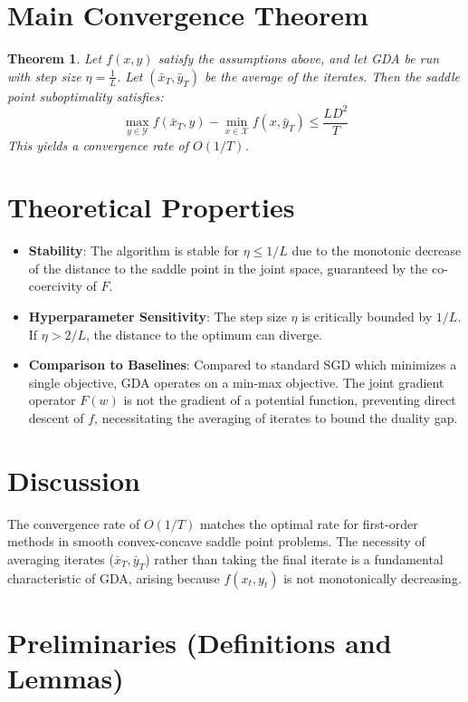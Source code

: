 \documentclass{article}
\newtheorem{theorem}{Theorem}
\begin{document}
\section*{Main Convergence Theorem}
\begin{theorem}
Let $f(x,y)$ satisfy the assumptions above, and let GDA be run with step size $\eta = \frac{1}{L}$. Let $(\bar{x}_T, \bar{y}_T)$ be the average of the iterates. Then the saddle point suboptimality satisfies:
$$ \max_{y \in \mathcal{Y}} f(\bar{x}_T, y) - \min_{x \in \mathcal{X}} f(x, \bar{y}_T) \leq \frac{L D^2}{T} $$
This yields a convergence rate of $O(1/T)$.
\end{theorem}

\section*{Theoretical Properties}
\begin{itemize}
    \item \textbf{Stability}: The algorithm is stable for $\eta \leq 1/L$ due to the monotonic decrease of the distance to the saddle point in the joint space, guaranteed by the co-coercivity of $F$.
    \item \textbf{Hyperparameter Sensitivity}: The step size $\eta$ is critically bounded by $1/L$. If $\eta > 2/L$, the distance to the optimum can diverge.
    \item \textbf{Comparison to Baselines}: Compared to standard SGD which minimizes a single objective, GDA operates on a min-max objective. The joint gradient operator $F(w)$ is not the gradient of a potential function, preventing direct descent of $f$, necessitating the averaging of iterates to bound the duality gap.
\end{itemize}

\section*{Discussion}
The convergence rate of $O(1/T)$ matches the optimal rate for first-order methods in smooth convex-concave saddle point problems. The necessity of averaging iterates ($\bar{x}_T, \bar{y}_T$) rather than taking the final iterate is a fundamental characteristic of GDA, arising because $f(x_t, y_t)$ is not monotonically decreasing.

\newpage
\section*{Preliminaries (Definitions and Lemmas)}
\end{document}
